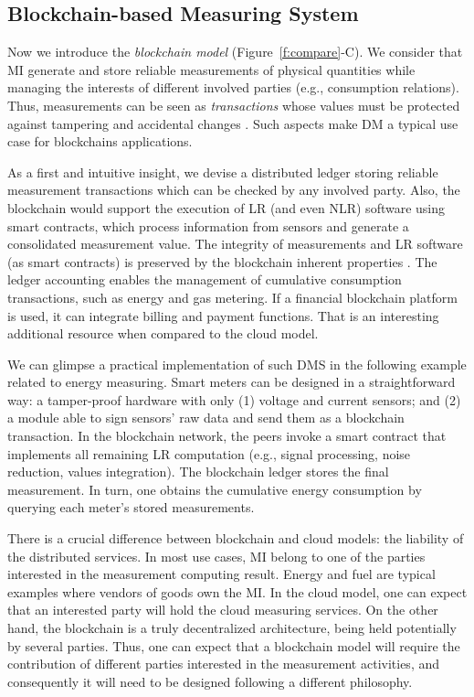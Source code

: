 \documentclass[journal]{IEEEtran}
\begin{document}
\subsection{Blockchain-based Measuring System}
\label{s:mi_blockchain}
Now we introduce the \emph{blockchain model} (Figure~\ref{f:compare}-C). 
We consider that MI generate and store reliable measurements of physical quantities while managing the interests of different involved parties (e.g., consumption relations). 
Thus, measurements can be seen as \emph{transactions} whose values must be protected against tampering and accidental changes \cite{Esche2015}.
Such aspects make DM a typical use case for blockchains applications. 

As a first and intuitive insight, we devise a distributed ledger storing reliable measurement transactions which can be checked by any involved party. 
Also, the blockchain would support the execution of LR (and even NLR) software using smart contracts, which process information from sensors and generate a consolidated measurement value. 
The integrity of measurements and LR software (as smart contracts) is preserved by the blockchain inherent properties \cite{Zheng2017}.
The ledger accounting enables the management of cumulative consumption transactions, such as energy and gas metering.
If a financial blockchain platform is used, it can integrate billing and payment functions. 
That is an interesting additional resource when compared to the cloud model.

We can glimpse a practical implementation of such DMS in the following example related to energy measuring. 
Smart meters can be designed in a straightforward way: a tamper-proof hardware with only (1) voltage and current sensors; and (2) a module able to sign sensors' raw data and send them as a blockchain transaction. 
In the blockchain network, the peers invoke a smart contract that implements all remaining LR computation (e.g., signal processing, noise reduction, values integration). 
The blockchain ledger stores the final measurement. 
In turn, one obtains the cumulative energy consumption by querying each meter's stored measurements.

There is a crucial difference between blockchain and cloud models: the liability of the distributed services. 
In most use cases, MI belong to one of the parties interested in the measurement computing result. 
Energy and fuel are typical examples where vendors of goods own the MI.
In the cloud model, one can expect that an interested party will hold the cloud measuring services. 
On the other hand, the blockchain is a truly decentralized architecture, being held potentially by several parties. 
Thus, one can expect that a blockchain model will require the contribution of different parties interested in the measurement activities, and consequently it will need to be designed following a different philosophy.
\end{document}
